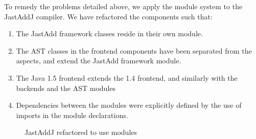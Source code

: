 To remedy the problems detailed above, we apply the module system to
the JastAddJ compiler. We have refactored the components such that:

\begin{enumerate}
\item {The JastAdd framework classes reside in their own module.}
\item {The AST classes in the frontend components have been separated from the aspects, and extend the JastAdd framework module.}
\item {The Java 1.5 frontend extends the 1.4 frontend, and similarly with the backends and the AST modules}
\item {Dependencies between the modules were explicitly defined by the use of imports in the module declarations.}
	
\end{enumerate}

\begin{figure}[htb!]
  \begin{center}
    \caption{JastAddJ refactored to use modules}
    \label{ModuleMainComponents}
  \end{center}
\end{figure}

